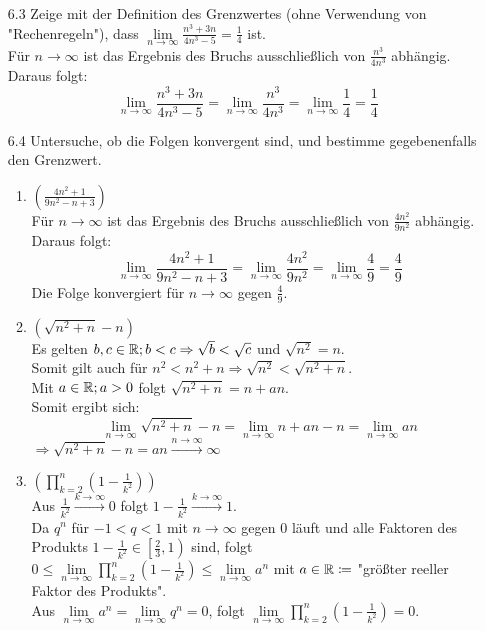 \documentclass{HM}
\begin{document}
\begin{enumerate}
	\item[6.3] Zeige mit der Definition des Grenzwertes (ohne Verwendung von "Rechenregeln"), dass $\lim\limits_{n\to\infty}\frac{n^3+3n}{4n^3-5}=\frac{1}{4}$ ist.\\
	Für $n\to\infty$ ist das Ergebnis des Bruchs ausschließlich von $\frac{n^3}{4n^3}$ abhängig. Daraus folgt:\\
	$$\lim\limits_{n\to\infty}\frac{n^3+3n}{4n^3-5}=\lim\limits_{n\to\infty}\frac{n^3}{4n^3}=\lim\limits_{n\to\infty}\frac{1}{4}=\frac{1}{4}$$
	\item[6.4] Untersuche, ob die Folgen konvergent sind, und bestimme gegebenenfalls den Grenzwert.
	\begin{enumerate}
		\item $\left(\frac{4n^2+1}{9n^2-n+3}\right)$\\
		Für $n\to\infty$ ist das Ergebnis des Bruchs ausschließlich von $\frac{4n^2}{9n^2}$ abhängig. Daraus folgt:\\
		$$\lim\limits_{n\to\infty}\frac{4n^2+1}{9n^2-n+3}
		=\lim\limits_{n\to\infty}\frac{4n^2}{9n^2}
		=\lim\limits_{n\to\infty}\frac{4}{9}
		=\frac{4}{9}$$
		Die Folge konvergiert für $n\to\infty$ gegen $\frac{4}{9}$.
		
		\item $\left(\sqrt{n^2+n}-n\right)$\\
		Es gelten $b,c\in\mathbb{R};b<c \Rightarrow\sqrt{b}<\sqrt{c}$ und $\sqrt{n^2}=n$. \\
		Somit gilt auch für $n^2<n^2+n \Rightarrow \sqrt{n^2}<\sqrt{n^2+n}$.\\
		Mit $a\in\mathbb{R}; a>0$ folgt $\sqrt{n^2+n}=n+an$.\\
		Somit ergibt sich:
		$$\lim\limits_{n\to\infty}\sqrt{n^2+n}-n
		=\lim\limits_{n\to\infty}n+an-n
		=\lim\limits_{n\to\infty}an$$
		$\Rightarrow \sqrt{n^2+n}-n=an\xrightarrow{n\to\infty}\infty$
		
		\item $\left(\prod\limits_{k=2}^n\left(1-\frac{1}{k^2}\right)\right)$\\
		Aus $\frac{1}{k^2}\xrightarrow{k\to\infty}0$ folgt $1-\frac{1}{k^2}\xrightarrow{k\to\infty}1$.\\
		Da $q^n$ für $-1<q<1$ mit $n\to\infty$ gegen 0 läuft und alle Faktoren des Produkts $1-\frac{1}{k^2} \in\left[\frac{2}{3}, 1\right)$ sind, folgt $0\leq \lim\limits_{n\to\infty}\prod\limits_{k=2}^n\left(1-\frac{1}{k^2}\right) \leq \lim\limits_{n\to\infty}a^n$ mit $a\in\mathbb{R}\coloneqq$ "größter reeller Faktor des Produkts".\\
		Aus $\lim\limits_{n\to\infty}a^n=\lim\limits_{n\to\infty}q^n=0$, folgt $\lim\limits_{n\to\infty}\prod\limits_{k=2}^n\left(1-\frac{1}{k^2}\right) = 0$.
		

\end{enumerate}
\end{enumerate}
\end{document}
